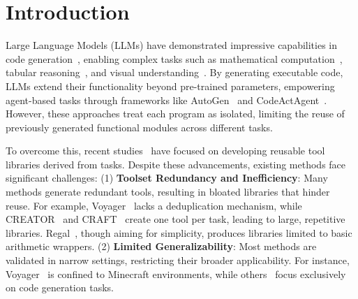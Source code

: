 \section{Introduction}
\label{sec:intro}

Large Language Models (LLMs) have demonstrated impressive capabilities in code generation~\citep{cassano2023type, li2023starcoder, roziere2023code, hui2024qwen2}, enabling complex tasks such as mathematical computation~\citep{zhou2023solving, wang2023mathcoder}, tabular reasoning~\citep{chen2022program}, and visual understanding~\citep{suris2023vipergpt, choudhury2023zero}. By generating executable code, LLMs extend their functionality beyond pre-trained parameters, empowering agent-based tasks through frameworks like AutoGen~\citep{wu2023autogen} and CodeActAgent~\citep{wang2024executable}. However, these approaches treat each program as isolated, limiting the reuse of previously generated functional modules across different tasks.

To overcome this, recent studies~\citep{wang2023voyager, cai2023large, qian2023creator, yuan2023craft, stengel2024regal} have focused on developing reusable tool libraries derived from tasks. Despite these advancements, existing methods face significant challenges: (1) \textbf{Toolset Redundancy and Inefficiency}: Many methods generate redundant tools, resulting in bloated libraries that hinder reuse. For example, Voyager~\citep{wang2023voyager} lacks a deduplication mechanism, while CREATOR~\citep{qian2023creator} and CRAFT~\citep{yuan2023craft} create one tool per task, leading to large, repetitive libraries. Regal~\citep{stengel2024regal}, though aiming for simplicity, produces libraries limited to basic arithmetic wrappers. (2) \textbf{Limited Generalizability}: Most methods are validated in narrow settings, restricting their broader applicability. For instance, Voyager~\citep{wang2023voyager} is confined to Minecraft environments, while others~\citep{cai2023large, qian2023creator, yuan2023craft, wang2024trove, stengel2024regal} focus exclusively on code generation tasks.

